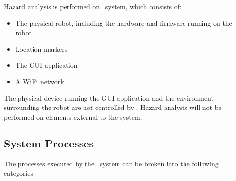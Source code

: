 \documentclass[12pt]{article}
\begin{document}
Hazard analysis is performed on \progname ~system, which consists of: 

\begin{itemize}
\item The physical robot, including the hardware and firmware running on the robot
\item Location markers
\item The GUI application
\item A WiFi network
\end{itemize}

The physical device running the GUI application and the environment surrounding the robot are not controlled by \progname. Hazard analysis will not be performed on elements external to the system.
 
\subsection{System Processes}

 \noindent The processes executed by the \progname ~system can be broken into the following categories:
\end{document}
